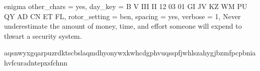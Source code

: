 \parindent0pt
 {enigma}
 {
    other_chars = yes,
        day_key = B V III II 12 03 01 GI JV KZ WM PU QY AD CN ET FL,
  rotor_setting = ben,
        spacing = yes,
        verbose = 1,
}
\startencryption
  Never underestimate the amount of money, time, and effort someone
  will expend to thwart a security system.
\stopencryption

\startdecryption
  aqsnwyxgqarpuzrdktscbslaqmdhyonywxkwhcdgphvuqsspfjwhlszahygjbzmfpcpbniahvfcuradntepxsfchnn
\stopdecryption
\bye
